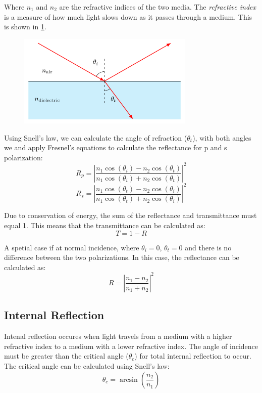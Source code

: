 Where $n_1$ and $n_2$ are the refractive indices of the two media. The \emph{refractive index} is a measure of how much light slows down as it passes through a medium. This is shown in \cref{fig:single-layer}.
\begin{figure}[H]\label{fig:single-layer}
  \centering
  \includegraphics[width=0.75\textwidth]{figures/single-layer.pdf}
  \caption{}
\end{figure}

Using Snell's law, we can calculate the angle of refraction ($\theta_t$), with both angles we and apply Fresnel's equations to calculate the reflectance for p and s polarization:
\begin{equation}
  R_p = \left| \frac{n_1 \cos(\theta_i) - n_2 \cos(\theta_t)}{n_1 \cos(\theta_i) + n_2 \cos(\theta_t)} \right|^2
\end{equation}
\begin{equation}
  R_s = \left| \frac{n_1 \cos(\theta_t) - n_2 \cos(\theta_i)}{n_1 \cos(\theta_t) + n_2 \cos(\theta_i)} \right|^2
\end{equation}

Due to conservation of energy, the sum of the reflectance and transmittance must equal 1. This means that the transmittance can be calculated as:
\begin{equation}
  T = 1 - R
\end{equation}


A spetial case if at normal incidence, where $\theta_i = 0$, $\theta_t = 0$ and there is no difference between the two polarizations. In this case, the reflectance can be calculated as:
\begin{equation}
  R = \left| \frac{n_1 - n_2}{n_1 + n_2} \right|^2
\end{equation}




\subsection{Internal Reflection}
Intenal reflection occures when light travels from a medium with a higher refractive index to a medium with a lower refractive index. The angle of incidence must be greater than the critical angle ($\theta_c$) for total internal reflection to occur. The critical angle can be calculated using Snell's law:
\begin{equation}
  \theta_c = \arcsin\left(\frac{n_2}{n_1}\right)
  \end{equation}

